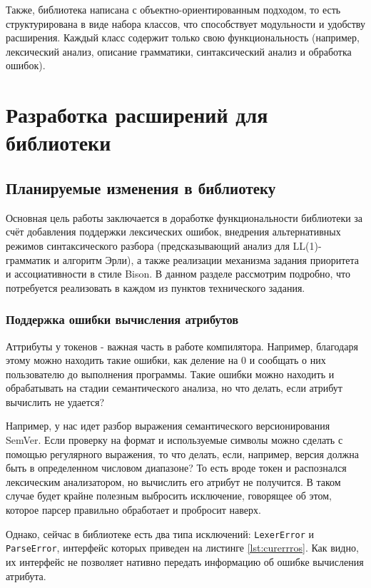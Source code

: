 \documentclass[14pt, russian]{scrartcl}
\begin{document}
Также, библиотека написана с объектно-ориентированным подходом, то есть структурирована в виде набора классов,
что способствует модульности и удобству расширения. Каждый класс содержит только свою функциональность
(например, лексический анализ, описание грамматики, синтаксический анализ и обработка ошибок).

\section{Разработка расширений для библиотеки}

\subsection{Планируемые изменения в библиотеку}

Основная цель работы заключается в доработке функциональности библиотеки за счёт добавления поддержки лексических
ошибок, внедрения альтернативных режимов синтаксического разбора (предсказывающий анализ для LL(1)-грамматик
и алгоритм Эрли), а также реализации механизма задания приоритета и ассоциативности в стиле Bison. В данном разделе
рассмотрим подробно, что потребуется реализовать в каждом из пунктов технического задания.

\subsubsection{Поддержка ошибки вычисления атрибутов}

Аттрибуты у токенов - важная часть в работе компилятора. Например, благодаря этому можно находить такие ошибки, как
деление на 0 и сообщать о них пользователю до выполнения программы. Такие ошибки можно находить и обрабатывать
на стадии семантического анализа, но что делать, если атрибут вычислить не удается?

Например, у нас идет разбор
выражения семантического версионирования SemVer. Если проверку на формат и используемые символы можно сделать с помощью
регулярного выражения, то что делать, если, например, версия должна быть в определенном числовом диапазоне? То есть
вроде токен и распознался лексическим анализатором, но вычислить его атрибут не получится. В таком случае будет
крайне полезным выбросить исключение, говорящее об этом, которое парсер правильно обработает и пробросит наверх.

Однако, сейчас в библиотеке есть два типа исключений: \texttt{LexerError} и \texttt{ParseError}, интерфейс которых
приведен на листинге \ref{lst:curerrros}. Как видно, их интерфейс не позволяет нативно передать информацию об ошибке
вычисления атрибута.
\end{document}

